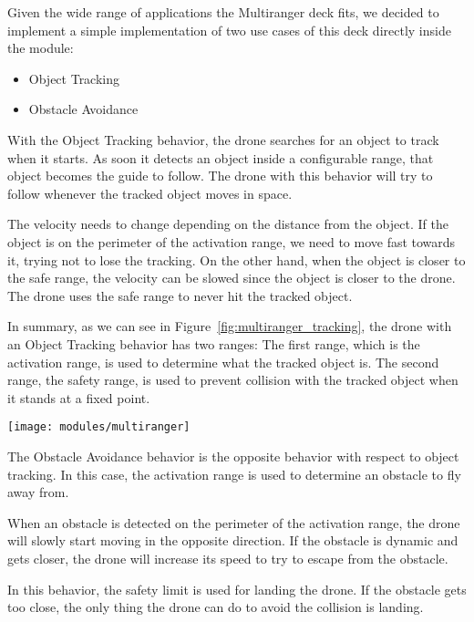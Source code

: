 Given the wide range of applications the Multiranger deck fits, we decided to implement a simple implementation of two use cases of this deck directly inside the module:
\begin{itemize}
    \item Object Tracking 
    \item Obstacle Avoidance
\end{itemize}

With the Object Tracking behavior, the drone searches for an object to track when it starts. 
As soon it detects an object inside a configurable range, that object becomes the guide to follow. 
The drone with this behavior will try to follow whenever the tracked object moves in space. 

The velocity needs to change depending on the distance from the object. 
If the object is on the perimeter of the activation range, we need to move fast towards it, trying not to lose the tracking. 
On the other hand, when the object is closer to the safe range, the velocity can be slowed since the object is closer to the drone.
The drone uses the safe range to never hit the tracked object.

In summary, as we can see in Figure~\ref{fig:multiranger_tracking}, the drone with an Object Tracking behavior has two ranges:
The first range, which is the activation range, is used to determine what the tracked object is.
The second range, the safety range, is used to prevent collision with the tracked object when it stands at a fixed point.

\begin{SCfigure}[\sidecaptionrelwidth][tb]
    \texttt{[image: modules/multiranger]}
    \caption{Multiranger Object Tracking behavior.}\label{fig:multiranger_tracking}
\end{SCfigure}

The Obstacle Avoidance behavior is the opposite behavior with respect to object tracking. 
In this case, the activation range is used to determine an obstacle to fly away from.

When an obstacle is detected on the perimeter of the activation range, the drone will slowly start moving in the opposite direction. 
If the obstacle is dynamic and gets closer, the drone will increase its speed to try to escape from the obstacle.

In this behavior, the safety limit is used for landing the drone. 
If the obstacle gets too close, the only thing the drone can do to avoid the collision is landing.


